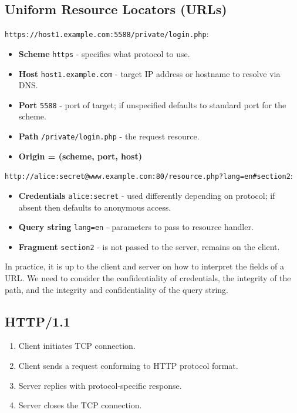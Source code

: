 \documentclass[11pt]{article}
\begin{document}
\subsection{Uniform Resource Locators (URLs)}
\texttt{https://host1.example.com:5588/private/login.php}:
\begin{itemize}
  \item \textbf{Scheme} \texttt{https} - specifies what protocol to use.
  \item \textbf{Host} \texttt{host1.example.com} - target IP address or hostname to resolve via DNS.
  \item \textbf{Port} \texttt{5588} - port of target; if unspecified defaults to standard port for the scheme.
  \item \textbf{Path} \texttt{/private/login.php} - the request resource.
  \item \textbf{Origin = (scheme, port, host)}
\end{itemize}

\texttt{http://alice:secret@www.example.com:80/resource.php?lang=en\#section2}:
\begin{itemize}
  \item \textbf{Credentials} \texttt{alice:secret} - used differently depending on protocol; if absent then defaults to anonymous access.
  \item \textbf{Query string} \texttt{lang=en} - parameters to pass to resource handler.
  \item \textbf{Fragment} \texttt{section2} - is not passed to the server, remains on the client.
\end{itemize}
In practice, it is up to the client and server on how to interpret the fields of a URL.
We need to consider the confidentiality of credentials, the integrity of the path, and the integrity and confidentiality of the query string.

\subsection{HTTP/1.1}
\begin{enumerate}
  \item Client initiates TCP connection.
  \item Client sends a request conforming to HTTP protocol format.
  \item Server replies with protocol-specific response.
  \item Server closes the TCP connection.
\end{enumerate}
\end{document}
